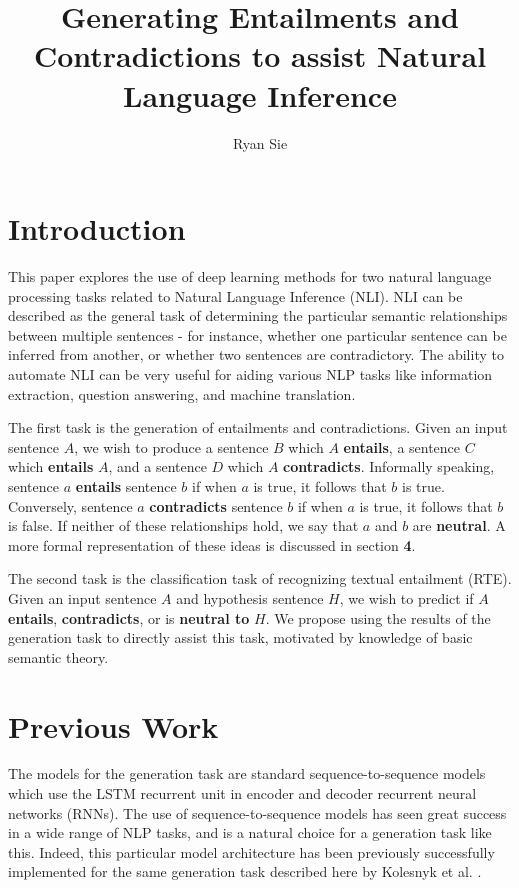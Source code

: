 \documentclass[a4paper, 12pt]{article}
\title{Generating Entailments and Contradictions to assist Natural Language Inference}
\date{}
\author{Ryan Sie}
\theoremstyle{definition}
\begin{document}
\maketitle

\section{Introduction}


This paper explores the use of deep learning methods for two natural language processing tasks related to Natural Language Inference (NLI). NLI can be described as the general task of determining the particular semantic relationships between multiple sentences - for instance, whether one particular sentence can be inferred from another, or whether two sentences are contradictory. The ability to automate NLI can be very useful for aiding various NLP tasks like information extraction, question answering, and machine translation.

\bigskip

The first task is the generation of entailments and contradictions. Given an input sentence $A$, we wish to produce a sentence $B$ which $A$ \textbf{entails}, a sentence $C$ which \textbf{entails} $A$, and a sentence $D$ which $A$ \textbf{contradicts}. Informally speaking, sentence $a$ \textbf{entails} sentence $b$ if when $a$ is true, it follows that $b$ is true. Conversely, sentence $a$ \textbf{contradicts} sentence $b$ if when $a$ is true, it follows that $b$ is false. If neither of these relationships hold, we say that $a$ and $b$ are \textbf{neutral}. A more formal representation of these ideas is discussed in section \textbf{4}. 

\bigskip

The second task is the classification task of recognizing textual entailment (RTE). Given an input sentence $A$ and hypothesis sentence $H$, we wish to predict if $A$ \textbf{entails}, \textbf{contradicts}, or is \textbf{neutral to} $H$. We propose using the results of the generation task to directly assist this task, motivated by knowledge of basic semantic theory.

\section{Previous Work}

The models for the generation task are standard sequence-to-sequence models \cite{seq-to-seq-sutskever} which use the LSTM \cite{lstm-schmid} recurrent unit in encoder and decoder recurrent neural networks (RNNs). The use of sequence-to-sequence models has seen great success in a wide range of NLP tasks, and is a natural choice for a generation task like this. Indeed, this particular model architecture has been previously successfully implemented for the same generation task described here by Kolesnyk et al. \cite{gen-nli-kolesnyk}.
\end{document}
